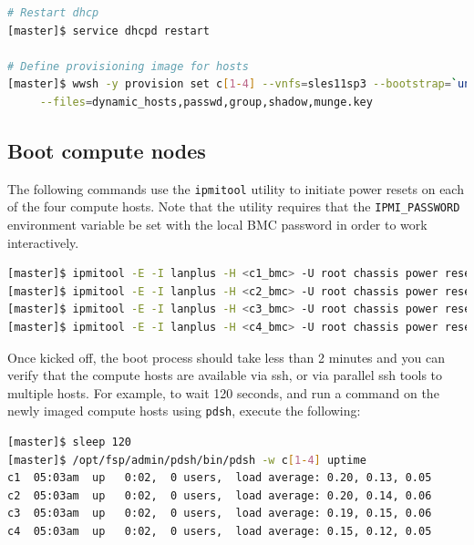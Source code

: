 \documentclass[letterpaper]{article}
\begin{document}
{\begin{lstlisting}[language=bash,keywords={},upquote=true,basicstyle=\footnotesize\ttfamily]
# Restart dhcp 
[master]$ service dhcpd restart

# Define provisioning image for hosts
[master]$ wwsh -y provision set c[1-4] --vnfs=sles11sp3 --bootstrap=`uname -r` \
     --files=dynamic_hosts,passwd,group,shadow,munge.key 
\end{lstlisting}





\subsection{Boot compute nodes}

 
The following commands use the \texttt{ipmitool} utility to initiate power
resets on each of the four compute hosts. Note that the utility requires that
the \texttt{IPMI\_PASSWORD} environment variable be set with the local BMC password in
order to work interactively.


\begin{lstlisting}[language=bash,keywords={},upquote=true]
[master]$ ipmitool -E -I lanplus -H <c1_bmc> -U root chassis power reset   # power cycle c1
[master]$ ipmitool -E -I lanplus -H <c2_bmc> -U root chassis power reset   # power cycle c2
[master]$ ipmitool -E -I lanplus -H <c3_bmc> -U root chassis power reset   # power cycle c3
[master]$ ipmitool -E -I lanplus -H <c4_bmc> -U root chassis power reset   # power cycle c4
\end{lstlisting} 


Once kicked off, the boot process should take less than 2 minutes and you can
verify that the compute hosts are available via ssh, or via parallel ssh tools to multiple
hosts. For example, to wait 120 seconds, and run a command on the newly imaged
compute hosts using \texttt{pdsh}, execute the following:

\begin{lstlisting}[language=bash]
[master]$ sleep 120
[master]$ /opt/fsp/admin/pdsh/bin/pdsh -w c[1-4] uptime
c1  05:03am  up   0:02,  0 users,  load average: 0.20, 0.13, 0.05
c2  05:03am  up   0:02,  0 users,  load average: 0.20, 0.14, 0.06
c3  05:03am  up   0:02,  0 users,  load average: 0.19, 0.15, 0.06
c4  05:03am  up   0:02,  0 users,  load average: 0.15, 0.12, 0.05
\end{lstlisting}



}
\end{document}
